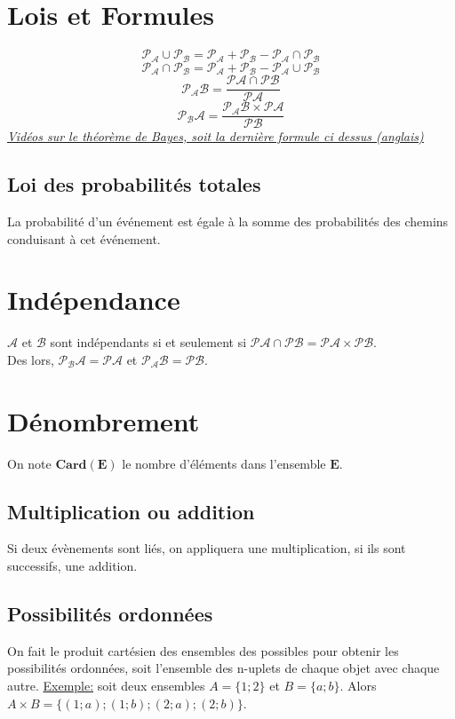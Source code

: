 \documentclass{article}
\begin{document}
\section{Lois et Formules}
$$\mathcal{P_A} \cup \mathcal{P_B} = \mathcal{P_A} +\mathcal{P_B} - \mathcal{P_A} \cap \mathcal{P_B}$$
$$\mathcal{P_A} \cap \mathcal{P_B} = \mathcal{P_A} +\mathcal{P_B} - \mathcal{P_A} \cup \mathcal{P_B}$$
$$\mathcal{P_AB} = \frac{\mathcal{PA} \cap \mathcal{PB}}{\mathcal{PA}}$$
$$\mathcal{P_BA} = \frac{\mathcal{P_AB} \times \mathcal{PA}}{\mathcal{PB}}$$
\break
\href{https://youtube.com/playlist?list=PLj2YHanZadz49HJPJqMucrW_KgTVXcmmP}{\underline{\textit{Vidéos sur le théorème de Bayes, soit la dernière formule ci dessus (anglais)}}}
\subsection{Loi des probabilités totales}
La probabilité d'un événement est égale à la somme des probabilités des chemins conduisant à cet événement.


\section{Indépendance}
$\mathcal{A}$ et $\mathcal{B}$ sont indépendants si et seulement si $\mathcal{PA} \cap \mathcal{PB} = \mathcal{PA} \times \mathcal{PB}$. \\
Des lors, $\mathcal{P_BA} = \mathcal{PA}$ et $\mathcal{P_AB} = \mathcal{PB}$.



\section{Dénombrement}
On note $\mathbf{Card(E)}$ le nombre d'éléments dans l'ensemble $\mathbf{E}$.

\subsection{Multiplication ou addition}
Si deux évènements sont liés, on appliquera une multiplication, si ils sont successifs, une addition.

\subsection{Possibilités ordonnées}
On fait le produit cartésien des ensembles des possibles pour obtenir les possibilités ordonnées, soit l'ensemble des n-uplets  de chaque objet avec chaque autre.
\underline{Exemple:} soit deux ensembles $A = \{1;2\}$ et $B=\{a;b\}$.  Alors $A\times B = \{(1;a);(1;b);(2;a);(2;b)\}$.
\end{document}
